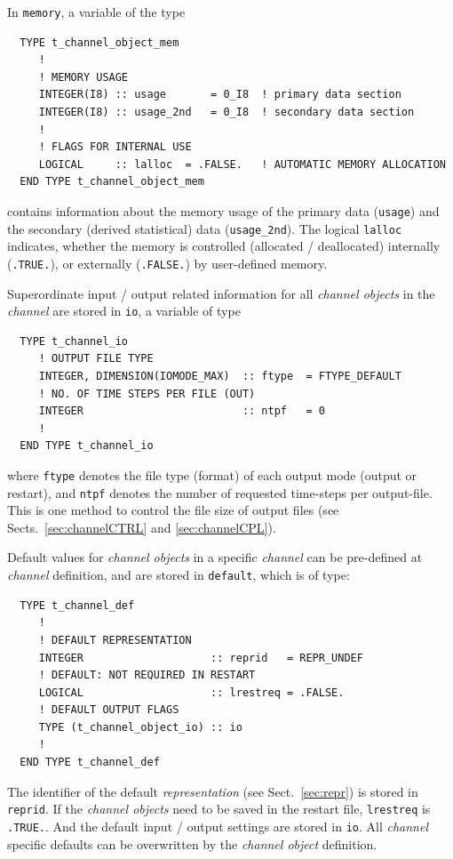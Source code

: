 \documentclass[twoside]{article}
\begin{document}
In {\tt memory}, a variable of the type
\begin{verbatim}
  TYPE t_channel_object_mem
     !
     ! MEMORY USAGE
     INTEGER(I8) :: usage       = 0_I8  ! primary data section
     INTEGER(I8) :: usage_2nd   = 0_I8  ! secondary data section
     !
     ! FLAGS FOR INTERNAL USE
     LOGICAL     :: lalloc  = .FALSE.   ! AUTOMATIC MEMORY ALLOCATION
  END TYPE t_channel_object_mem
\end{verbatim}
%
contains information about the memory usage of the primary data
({\tt usage}) and the secondary (derived statistical) data ({\tt usage\_2nd}).
The logical {\tt lalloc} indicates, whether the memory is controlled
(allocated / deallocated) internally ({\tt .TRUE.}), or externally
({\tt .FALSE.}) by user-defined memory.

Superordinate input / output related information for all {\it channel objects}
in the {\it channel} are stored in {\tt io}, a variable of type
%
\begin{verbatim}
  TYPE t_channel_io
     ! OUTPUT FILE TYPE
     INTEGER, DIMENSION(IOMODE_MAX)  :: ftype  = FTYPE_DEFAULT
     ! NO. OF TIME STEPS PER FILE (OUT)
     INTEGER                         :: ntpf   = 0
     !
  END TYPE t_channel_io
\end{verbatim}
where {\tt ftype} denotes the file type (format) of each output mode
(output or restart), and {\tt ntpf} denotes the number of requested
time-steps per output-file. This is one method to control the file size
of output files (see Sects.~\ref{sec:channelCTRL} and \ref{sec:channelCPL}).

Default values for {\it channel objects} in a specific {\it channel} can
be pre-defined at {\it channel} definition, and are stored in
{\tt default}, which is of type:
%
\begin{verbatim}
  TYPE t_channel_def
     !
     ! DEFAULT REPRESENTATION
     INTEGER                    :: reprid   = REPR_UNDEF
     ! DEFAULT: NOT REQUIRED IN RESTART
     LOGICAL                    :: lrestreq = .FALSE.
     ! DEFAULT OUTPUT FLAGS
     TYPE (t_channel_object_io) :: io
     !
  END TYPE t_channel_def
\end{verbatim}
%
The identifier of the default {\it representation} (see Sect.~\ref{sec:repr})
is stored in {\tt reprid}. If the {\it channel objects} need to be
saved in the restart file, {\tt lrestreq} is {\tt .TRUE.}. And the default
input / output settings are stored in {\tt io}.
%
All {\it channel} specific defaults can be overwritten by the
{\it channel object} definition.
\end{document}
